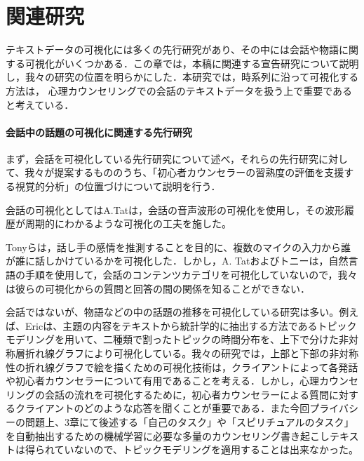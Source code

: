 \documentclass[shuuron]{kuee}
\begin{document}







\chapter{関連研究}






テキストデータの可視化には多くの先行研究があり、その中には会話や物語に関する可視化がいくつかある．この章では，本稿に関連する宣告研究について説明し，我々の研究の位置を明らかにした．本研究では，時系列に沿って可視化する方法は， 心理カウンセリングでの会話のテキストデータを扱う上で重要であると考えている．





\subsubsection{会話中の話題の可視化に関連する先行研究}

まず，会話を可視化している先行研究について述べ，それらの先行研究に対して、我々が提案するもののうち、「初心者カウンセラーの習熟度の評価を支援する視覚的分析」の位置づけについて説明を行う．




会話の可視化としてはA.Tat\cite{tat2002visualising}は，会話の音声波形の可視化を使用し，その波形履歴が周期的にわかるような可視化の工夫を施した。

Tonyら\cite{bergstrom2007seeing}は，話し手の感情を推測することを目的に、複数のマイクの入力から誰が誰に話しかけているかを可視化した．しかし，A. Tatおよびトニーは，自然言語の手順を使用して，会話のコンテンツカテゴリを可視化していないので，我々は彼らの可視化からの質問と回答の間の関係を知ることができない．


会話ではないが、物語などの中の話題の推移を可視化している研究は多い。例えば、Eric\cite{taskdriven}は、主題の内容をテキストから統計学的に抽出する方法であるトピックモデリングを用いて、二種類で割ったトピックの時間分布を、上下で分けた非対称層折れ線グラフにより可視化している。我々の研究では，上部と下部の非対称性の折れ線グラフで絵を描くための可視化技術は，クライアントによって各発話や初心者カウンセラーについて有用であることを考える．しかし，心理カウンセリングの会話の流れを可視化するために，初心者カウンセラーによる質問に対するクライアントのどのような応答を聞くことが重要である．また今回プライバシーの問題上、3章にて後述する「自己のタスク」や「スピリチュアルのタスク」を自動抽出するための機械学習に必要な多量のカウンセリング書き起こしテキストは得られていないので、トピックモデリングを適用することは出来なかった。
\end{document}
